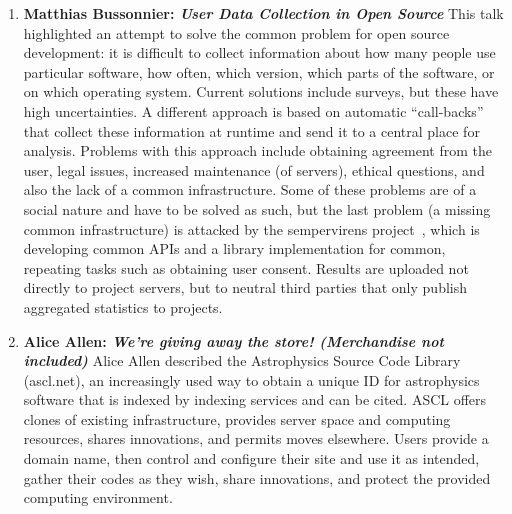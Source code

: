 \documentclass[11pt, oneside]{amsart}
\begin{document}
\begin{enumerate}
\item \textbf{Matthias Bussonnier: \textit{User Data Collection in Open Source}}
This talk highlighted an attempt to solve the common problem for open source
development: it is difficult to collect information about how many people use
particular software, how often, which version, which parts of the software, or
on which operating system. Current solutions include surveys, but these have
high uncertainties. A different approach is based on automatic ``call-backs''
that collect these information at runtime and send it to a central place for
analysis. Problems with this approach include obtaining agreement from the user,
legal issues, increased maintenance (of servers), ethical questions, and also the
lack of a common infrastructure. Some of these problems are of a social nature
and have to be solved as such, but the last problem (a missing common
infrastructure) is attacked by the sempervirens project~\cite{sempervirens},
which is developing common APIs and a library implementation for common,
repeating tasks such as obtaining user consent. Results are uploaded not
directly to project servers, but to neutral third parties that only publish
aggregated statistics to projects.

\item \textbf{Alice Allen: \textit{We're giving away the store! (Merchandise not
included)}} Alice Allen described the Astrophysics Source Code Library
(ascl.net), an increasingly used way to obtain a unique ID for astrophysics
software that is indexed by indexing services and can be cited. ASCL offers
clones of existing infrastructure, provides server space and computing
resources, shares innovations, and permits moves elsewhere. Users provide a
domain name, then control and configure their site and use it as intended,
gather their codes as they wish, share innovations, and protect the provided
computing environment.


\end{enumerate}
\end{document}
